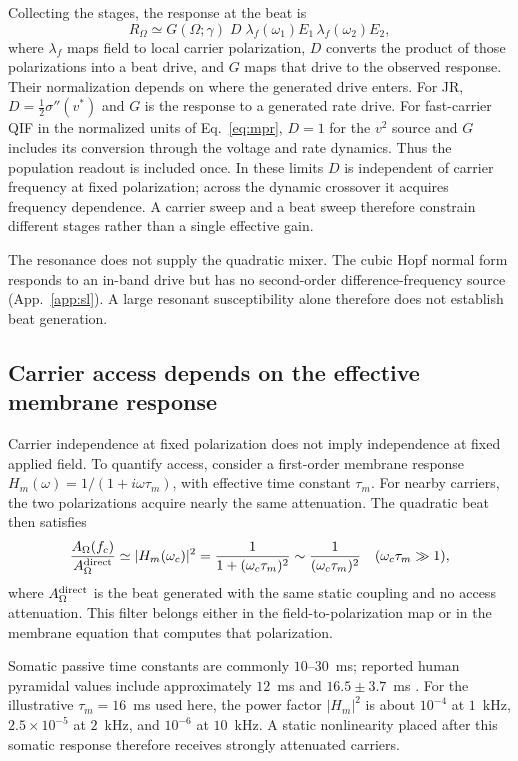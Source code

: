 \documentclass[11pt,a4paper]{article}
\newcommand{\Sig}{\sigma}
\newcommand{\half}{\tfrac{1}{2}}
\begin{document}
Collecting the stages, the response at the beat is
\begin{equation}
R_\Omega\simeq G(\Omega;\gamma)\;D\;\lambda_f(\omega_1)E_1\,\lambda_f(\omega_2)E_2 ,
\label{eq:receiver}
\end{equation}
where $\lambda_f$ maps field to local carrier polarization, $D$ converts the
product of those polarizations into a beat drive, and $G$ maps that drive to the
observed response. Their normalization depends on where the generated drive enters.
For JR, $D=\half\Sig''(v^*)$ and $G$ is the response to a generated rate drive.
For fast-carrier QIF in the normalized units of Eq.~\eqref{eq:mpr}, $D=1$ for
the $v^2$ source and $G$ includes its conversion through the voltage and rate
dynamics. Thus the population readout is included once. In these limits $D$ is
independent of carrier frequency at fixed polarization; across the dynamic
crossover it acquires frequency dependence. A carrier sweep and a beat sweep
therefore constrain different stages rather than a single effective gain.

The resonance does not supply the quadratic mixer. The cubic Hopf normal form
responds to an in-band drive but has no second-order difference-frequency source
(App.~\ref{app:sl}). A large resonant susceptibility alone therefore does not
establish beat generation.

\subsection{Carrier access depends on the effective membrane response}\label{sec:khz}
Carrier independence at fixed polarization does not imply independence at fixed
applied field. To quantify access, consider a first-order membrane response
$H_m(\omega)=1/(1+i\omega\tau_m)$, with effective time constant $\tau_m$.
For nearby carriers, the two polarizations acquire nearly the same attenuation.
The quadratic beat then satisfies
\begin{equation}
\frac{A_\Omega(f_c)}{A_\Omega^{\rm direct}}
\simeq |H_m(\omega_c)|^2
=\frac{1}{1+(\omega_c\tau_m)^2}
\sim\frac{1}{(\omega_c\tau_m)^2}
\quad(\omega_c\tau_m\gg1),
\label{eq:khz}
\end{equation}
where $A_\Omega^{\rm direct}$ is the beat generated with the same static coupling
and no access attenuation. This filter belongs either in the field-to-polarization
map or in the membrane equation that computes that polarization.

Somatic passive time constants are commonly $10$--$30$~ms; reported human pyramidal
values include approximately $12$~ms \cite{deitcher2017} and $16.5\pm3.7$~ms
\cite{eyal2016}. For the illustrative $\tau_m=16$~ms used here, the power factor
$|H_m|^2$ is about $10^{-4}$ at $1$~kHz, $2.5\times10^{-5}$ at $2$~kHz, and
$10^{-6}$ at $10$~kHz. A static nonlinearity placed after this somatic response
therefore receives strongly attenuated carriers.
\end{document}
